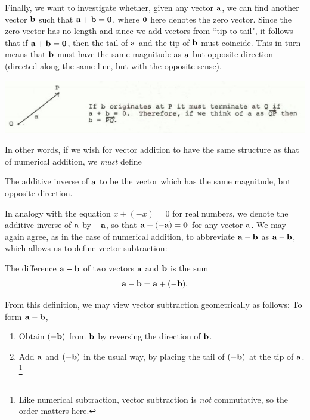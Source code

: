 \documentclass[12pt,letterpaper,reqno]{article}
\numberwithin{equation}{section}
\newcommand{\ti}[1]{\textit{#1}}
\begin{document}
Finally, we want to investigate whether, given any vector ${\bf a}$, we can find another vector ${\bf b}$ such that ${\bf a}+{\bf b}={\bf 0}$, where ${\bf 0}$ here denotes the zero vector. Since the zero vector has no length and since we add vectors from ``tip to tail", it follows that if ${\bf a}+{\bf b}={\bf 0}$, then the tail of ${\bf a}$ and the tip of ${\bf b}$ must coincide. This in turn means that ${\bf b}$ must have the same magnitude as ${\bf a}$ but opposite direction (directed along the same line, but with the opposite sense).  
\begin{center}
	\includegraphics[scale=0.5]{figures_mvc/a_plus_b_equals_zero}
\end{center}
In other words, if we wish for vector addition to have the same structure as that of numerical addition, we \ti{must} define 
\begin{defn}
The additive inverse of ${\bf a}$ to be the vector which has the same magnitude, but opposite direction. 	
\end{defn}
In analogy with the equation $x+(-x)=0$ for real numbers, we denote the additive inverse of ${\bf a}$ by $-{\bf a}$, so that ${\bf a}+(-{\bf a})={\bf 0}$ for any vector ${\bf a}$. We may again agree, as in the case of numerical addition, to abbreviate ${\bf a}-{\bf b}$ as ${\bf a}-{\bf b}$, which allows us to define vector subtraction:

\begin{defn}
	The difference ${\bf a}-{\bf b}$ of two vectors ${\bf a}$ and ${\bf b}$ is the sum
	\begin{align*}
		{\bf a}-{\bf b}={\bf a}+(-{\bf b}).
	\end{align*}
\end{defn}
From this definition, we may view vector subtraction geometrically as follows: To form ${\bf a}-{\bf b}$,
\begin{enumerate}[(1)]
	\item Obtain $(-{\bf b})$ from ${\bf b}$ by reversing the direction of ${\bf b}$.
	\item Add ${\bf a}$ and $(-{\bf b})$ in the usual way, by placing the tail of $(-{\bf b})$ at the tip of ${\bf a}$. \footnote{Like numerical subtraction, vector subtraction is \ti{not} commutative, so the order matters here.}
\end{enumerate}
\end{document}

